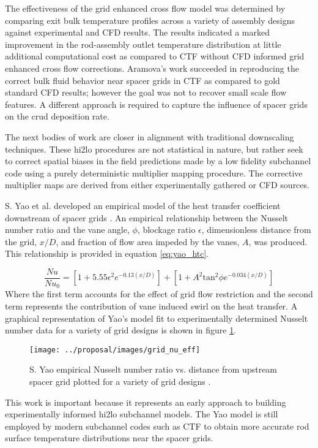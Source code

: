  The effectiveness of the grid enhanced cross flow model was determined by comparing exit bulk temperature profiles across a variety of assembly designs against experimental and CFD results.  The results indicated a marked improvement in the rod-assembly outlet temperature distribution at little additional computational cost as compared to CTF without CFD informed grid enhanced cross flow corrections.    Aramova's work succeeded in reproducing the correct bulk fluid behavior near spacer grids in CTF as compared to gold standard CFD results; however the goal was not to recover small scale flow features.  A different approach is required to capture the influence of spacer grids on the crud deposition rate.
 
 The next bodies of work are closer in alignment with traditional downscaling techniques.  These hi2lo procedures are not statistical in nature, but rather seek to correct spatial biases in the field predictions made by a low fidelity subchannel code using a purely deterministic multiplier mapping procedure.  The corrective multiplier maps are derived from either experimentally gathered or CFD sources.
    
S. Yao et al. developed an empirical model of the heat transfer coefficient downstream of spacer grids \cite{yao82}.
    An empirical relationship between the Nusselt number ratio and the vane angle, $\phi$, blockage ratio $\epsilon$, dimensionless distance from the grid, $x/D$, and fraction of flow area impeded by the vanes, $A$, was produced.  This relationship is provided in equation \ref{eq:yao_htc}.
    
\begin{equation}
\frac{Nu}{Nu_0}  = \left[ 1 + 5.55 \epsilon^2 e^{-0.13(x/D)}\right] + \left[ 1 + A^2\mathrm{tan}^2\phi e^{-0.034(x/D)} \right]
\label{eq:yao_htc}
\end{equation}
Where the first term accounts for the effect of grid flow restriction and the second term represents the contribution of vane induced swirl on the heat transfer.
A graphical representation of Yao's model fit to experimentally determined Nusselt number data for a variety of grid designs is shown in figure \ref{fig:gridnueff}.
\begin{figure}[H]
    \centering
    \texttt{[image: ../proposal/images/grid\_nu\_eff]}
    \caption[S. Yao empirical Nusselt number ratio vs. distance from upstream spacer.]{S. Yao empirical Nusselt number ratio vs. distance from upstream spacer grid plotted for a variety of grid designs \cite{yao82}.}
    \label{fig:gridnueff}
\end{figure}
This work is important because it represents an early approach to building experimentally informed hi2lo subchannel models.  The Yao model is still employed by modern subchannel codes such as CTF to obtain more accurate rod surface temperature distributions near the spacer grids.

